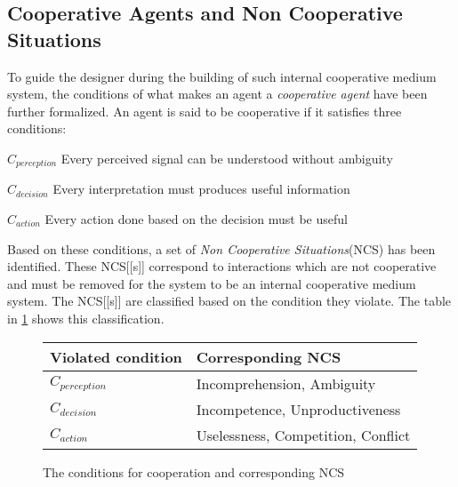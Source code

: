 \subsection{Cooperative Agents and Non Cooperative Situations}

To guide the designer during the building of such internal cooperative medium system, the conditions of what makes an agent a \emph{cooperative agent} have been further formalized. An agent is said to be cooperative if it satisfies three conditions:
\begin{compactitem}
\item $C_{perception}$ Every perceived signal can be understood without ambiguity
\item $C_{decision}$ Every interpretation must produces useful information
\item $C_{action}$ Every action done based on the decision must be useful
\end{compactitem}

Based on these conditions, a set of \emph{Non Cooperative Situations}(NCS) has been identified. These NCS[[s]] correspond to interactions which are not cooperative and must be removed for the system to be an internal cooperative medium system. The NCS[[s]] are classified based on the condition they violate. The table in \figurename{} \ref{NCS} shows this classification.

\begin{figure}
\centering
\begin{tabular}{ll}
\toprule
\textbf{Violated condition}	& \textbf{Corresponding NCS} \\
\midrule
$C_{perception}$     & Incomprehension, Ambiguity\\

$C_{decision}$      & Incompetence, Unproductiveness \\

$C_{action}$     & Uselessness, Competition, Conflict\\
\bottomrule
\end{tabular}
\caption{The conditions for cooperation and corresponding NCS}
\label{NCS}
\end{figure}

